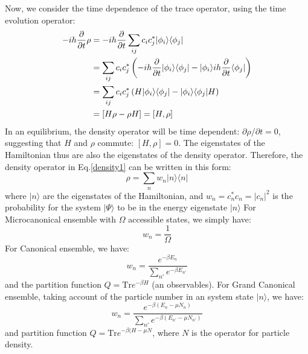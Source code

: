 \documentclass{article}
\begin{document}
Now, we consider the time dependence of the trace operator, using the time evolution operator:
\begin{align}
    -ih\frac{\partial}{\partial t} \rho &= -ih \frac{\partial}{\partial t}  \sum_{ij} c_i c_j^* |\phi_i\rangle \langle \phi_j| \notag \\
        &= \sum_{ij} c_i c_j^* \left( -ih\frac{\partial}{\partial t} |\phi_i\rangle \langle \phi_j| - |\phi_i\rangle ih\frac{\partial}{\partial t} \langle \phi_j|  \right) \notag \\
        &= \sum_{ij} c_i c_j^* \left(  H|\phi_i\rangle \langle \phi_j| - |\phi_i\rangle \langle \phi_j| H \right) \notag \\
        &= [H\rho  - \rho H] = [H,\rho]
\end{align}
In an equilibrium, the density operator will be time dependent: $\partial \rho / \partial t = 0$, suggesting that 
$H$ and $\rho$ commute:
$[H,\rho] = 0$. The eigenstates of the Hamiltonian thus are also the eigenstates of the density operator.
Therefore, the density operator in Eq.\ref{density1} can be written in this form:
\begin{equation}
    \rho = \sum_n w_n | n \rangle \langle n | \label{density2}
\end{equation}
where $|n\rangle$ are the eigenstates of the Hamiltonian, and $w_n = c_n^* c_n = |c_n|^2$ is the probability for the 
system $|\Psi\rangle$ to be in the energy eigenstate $|n\rangle$
For Microcanonical ensemble with $\Omega$ accessible states, we simply have:
\begin{equation}
    w_n = \frac{1}{\Omega}
\end{equation}
For Canonical ensemble, we have:
\begin{equation}
    w_n = \frac{e^{-\beta E_n}}{\sum_{n'} e^{-\beta E_{n'}}}
\end{equation}
and the partition function $Q = \text{Tr}e^{-\beta H}$ (an observables).
For Grand Canonical ensemble, taking account of the particle number in 
an system state $|n\rangle$, we have:
\begin{equation}
    w_n = \frac{e^{-\beta (E_n-\mu N_n)}}{\sum_{n'} e^{-\beta (E_{n'}-\mu N_{n'})}}
\end{equation}
and partition function $Q =  \text{Tr}e^{-\beta (H-\mu N}$, where $N$ is the operator for 
particle density.
\end{document}
